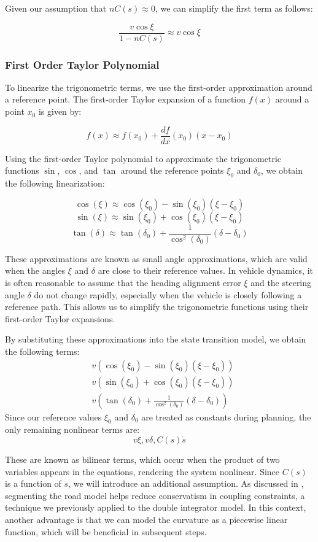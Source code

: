 Given our assumption that $nC(s) \approx 0$, we can simplify the first term as follows:

\[ \frac{v \cos\xi}{1 - nC(s)} \approx v
	\cos\xi \]

\subsubsection{First Order Taylor Polynomial} To linearize the trigonometric terms, we use the first-order
approximation around a reference point.
The first-order Taylor expansion of a function $f(x)$ around a point $x_0$ is given by:

\[ f(x) \approx f(x_0) + \frac{df}{dx}
	(x_0) (x - x_0) \]

Using the first-order Taylor polynomial to approximate the trigonometric functions $\sin$, $\cos$, and $\tan$
around the reference points $\xi_0$ and $\delta_0$, we obtain the following linearization:

\[ \cos(\xi) \approx \cos(\xi_0) -
	\sin(\xi_0) (\xi - \xi_0) \] \[ \sin(\xi) \approx \sin(\xi_0) + \cos(\xi_0) (\xi - \xi_0) \] \[ \tan(\delta) \approx \tan(\delta_0) +
	\frac{1}{\cos^2(\delta_0)} (\delta - \delta_0) \]

These approximations are known as small angle approximations, which are valid
when the angles $\xi$ and $\delta$ are close to their reference values.
In vehicle dynamics, it is often reasonable to assume that the heading alignment error $\xi$ and the steering angle $\delta$ do not change rapidly,
especially when the vehicle is closely following a reference path.
This allows us to simplify the trigonometric functions using their first-order Taylor expansions.

By substituting these approximations into the state transition model, we obtain the following terms:
\begin{align*}
	 & v (\cos(\xi_0) - \sin(\xi_0) (\xi - \xi_0))                         \\
	 & v (\sin(\xi_0) + \cos(\xi_0) (\xi - \xi_0))                         \\
	 & v (\tan(\delta_0) + \frac{1}{\cos^2(\delta_0)} (\delta - \delta_0))
\end{align*}
Since our reference values $\xi_0$ and $\delta_0$ are treated as constants during planning, the only remaining nonlinear terms are: $$v \xi, v
	\delta, C(s)\dot{s}$$

These are known as bilinear terms, which occur when the product of two variables appears in the equations,
rendering the system nonlinear.
Since $C(s)$ is a function of $s$, we will introduce an additional assumption.
As discussed in , segmenting the road model helps reduce conservatism in coupling constraints, a technique we
previously applied to the double integrator model.
In this context, another advantage is that we can model the curvature as a piecewise linear function, which will be beneficial in subsequent steps.

